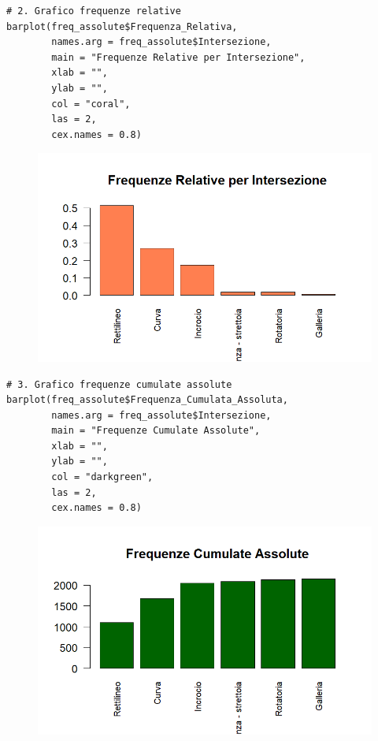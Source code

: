 \documentclass[14pt, openany, titlepage]{report} %
\begin{document}
\begin{center}
\begin{lstlisting}[breaklines=true]
# 2. Grafico frequenze relative
barplot(freq_assolute$Frequenza_Relativa, 
        names.arg = freq_assolute$Intersezione,
        main = "Frequenze Relative per Intersezione",
        xlab = "",
        ylab = "",
        col = "coral",
        las = 2,
        cex.names = 0.8)
\end{lstlisting}  
\end{center}

\begin{figure}[H] %
    \centering
    \includegraphics[width=12cm, height=7cm]{Rplot03.png} %
\end{figure}

\begin{center}
\begin{lstlisting}[breaklines=true]
# 3. Grafico frequenze cumulate assolute
barplot(freq_assolute$Frequenza_Cumulata_Assoluta, 
        names.arg = freq_assolute$Intersezione,
        main = "Frequenze Cumulate Assolute",
        xlab = "",
        ylab = "",
        col = "darkgreen",
        las = 2,
        cex.names = 0.8)
\end{lstlisting}  
\end{center}

\begin{figure}[H] %
    \centering
    \includegraphics[width=12cm, height=7cm]{Rplot04.png} %
\end{figure}
\end{document}
